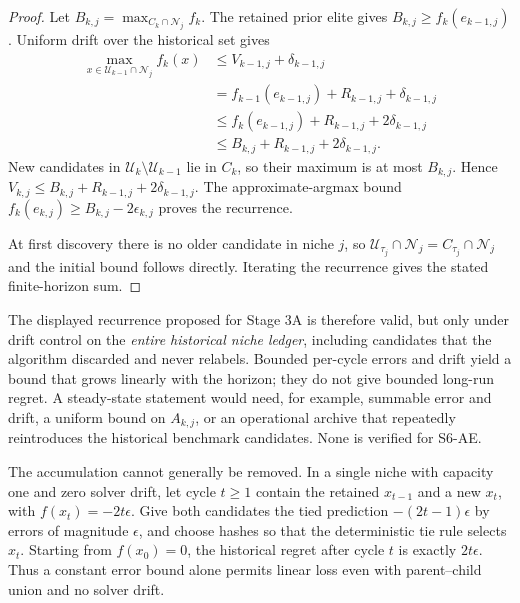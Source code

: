 \begin{proof}
Let $B_{k,j}=\max_{C_k\cap\mathcal N_j}f_k$.  The retained prior elite gives
$B_{k,j}\geq f_k(e_{k-1,j})$.  Uniform drift over the historical set gives
\begin{align*}
 \max_{x\in\mathcal U_{k-1}\cap\mathcal N_j}f_k(x)
 &\leq V_{k-1,j}+\delta_{k-1,j}\\
 &=f_{k-1}(e_{k-1,j})+R_{k-1,j}+\delta_{k-1,j}\\
 &\leq f_k(e_{k-1,j})+R_{k-1,j}+2\delta_{k-1,j}\\
 &\leq B_{k,j}+R_{k-1,j}+2\delta_{k-1,j}.
\end{align*}
New candidates in $\mathcal U_k\setminus\mathcal U_{k-1}$ lie in $C_k$, so
their maximum is at most $B_{k,j}$.  Hence
$V_{k,j}\leq B_{k,j}+R_{k-1,j}+2\delta_{k-1,j}$.  The approximate-argmax
bound $f_k(e_{k,j})\geq B_{k,j}-2\epsilon_{k,j}$ proves the recurrence.

At first discovery there is no older candidate in niche $j$, so
$\mathcal U_{\tau_j}\cap\mathcal N_j=C_{\tau_j}\cap\mathcal N_j$ and the
initial bound follows directly.  Iterating the recurrence gives the stated
finite-horizon sum.
\end{proof}

The displayed recurrence proposed for Stage 3A is therefore valid, but only
under drift control on the \emph{entire historical niche ledger}, including
candidates that the algorithm discarded and never relabels.  Bounded
per-cycle errors and drift yield a bound that grows linearly with the horizon;
they do not give bounded long-run regret.  A steady-state statement would
need, for example, summable error and drift, a uniform bound on
$A_{k,j}$, or an operational archive that repeatedly reintroduces the
historical benchmark candidates.  None is verified for S6-AE.

The accumulation cannot generally be removed.  In a single niche with
capacity one and zero solver drift, let cycle $t\geq1$ contain the retained
$x_{t-1}$ and a new $x_t$, with $f(x_t)=-2t\epsilon$.  Give both candidates
the tied prediction $-(2t-1)\epsilon$ by errors of magnitude $\epsilon$, and
choose hashes so that the deterministic tie rule selects $x_t$.  Starting
from $f(x_0)=0$, the historical regret after cycle $t$ is exactly
$2t\epsilon$.  Thus a constant error bound alone permits linear loss even
with parent--child union and no solver drift.

